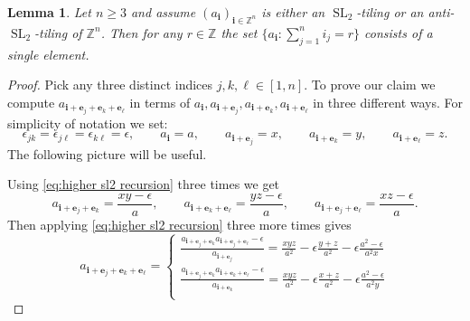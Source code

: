 \documentclass[11pt,reqno]{amsart}
\newtheorem{lemma}[theorem]{Lemma}
\newcommand{\be}{\boldsymbol{e}}
\newcommand{\bi}{\boldsymbol{i}}
\newcommand{\SL}{\operatorname{SL}}
\newcommand{\ZZ}{\mathbb{Z}}
\begin{document}
  \begin{lemma}\label{le:constant slices}
    Let $n\ge 3$ and assume $(a_{\bi})_{\bi\in\ZZ^n}$ is either an $\SL_2$-tiling or an anti-$\SL_2$-tiling of $\ZZ^n$.
    Then for any $r\in\ZZ$ the set $\{a_{\bi}: \sum_{j=1}^n i_j=r\}$ consists of a single element.
  \end{lemma}
  \begin{proof}
    Pick any three distinct indices $j,k,\ell\in[1,n]$.
    To prove our claim we compute $a_{\bi+\be_j+\be_k+\be_\ell}$ in terms of $a_{\bi}, a_{\bi+\be_j}, a_{\bi+\be_k}, a_{\bi+\be_\ell}$ in three different ways.
    For simplicity of notation we set:
    \[
      \epsilon_{jk}=\epsilon_{j\ell}=\epsilon_{k\ell}=\epsilon,
      \quad\quad 
      a_{\bi}=a,
      \quad\quad 
      a_{\bi+\be_j}=x,
      \quad\quad 
      a_{\bi+\be_k}=y,
      \quad\quad 
      a_{\bi+\be_\ell}=z.
    \]
    The following picture will be useful.
    \begin{center}
    \end{center}
    Using \eqref{eq:higher sl2 recursion} three times we get
    \[
      a_{\bi+\be_j+\be_k}=\frac{xy-\epsilon}{a},
      \quad\quad 
      a_{\bi+\be_k+\be_\ell}=\frac{yz-\epsilon}{a},
      \quad\quad 
      a_{\bi+\be_j+\be_\ell}=\frac{xz-\epsilon}{a}.
    \]
    Then applying \eqref{eq:higher sl2 recursion} three more times gives 
    \begin{equation*}
      a_{\bi+\be_j+\be_k+\be_\ell}=\left\{\begin{array}{l}
        \frac{a_{\bi+\be_j+\be_k}a_{\bi+\be_j+\be_\ell}-\epsilon}{a_{\bi+\be_j}}=\frac{xyz}{a^2}-\epsilon\frac{y+z}{a^2}-\epsilon\frac{a^2-\epsilon}{a^2x}\\
        \frac{a_{\bi+\be_j+\be_k}a_{\bi+\be_k+\be_\ell}-\epsilon}{a_{\bi+\be_k}}=\frac{xyz}{a^2}-\epsilon\frac{x+z}{a^2}-\epsilon\frac{a^2-\epsilon}{a^2y}\\

\end{array}
\end{equation*}
\end{proof}
\end{document}
